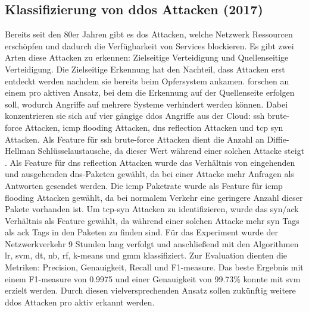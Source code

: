 \documentclass[
    12pt, %
    DIV10,
    ngerman, %
    a4paper, %
    oneside, %
    titlepage, %
    parskip=half, %
    headings=normal, %
    listof=totoc, %
    bibliography=totoc, %
    index=totoc, %
    captions=tableheading, %
    final %
]{scrreprt}
\begin{document}
\subsection{Klassifizierung von \acs{ddos} Attacken (2017)}
Bereits seit den 80er Jahren gibt es \ac{dos} Attacken, welche Netzwerk Ressourcen erschöpfen und dadurch die Verfügbarkeit von Services blockieren. Es gibt zwei Arten diese Attacken zu erkennen: Zielseitige Verteidigung und Quellenseitige Verteidigung\parencite{He2017}. Die Zielseitige Erkennung hat den Nachteil, dass Attacken erst entdeckt werden nachdem sie bereits beim Opfersystem ankamen. \textcite{He2017} forschen an einem pro aktiven Ansatz, bei dem die Erkennung auf der Quellenseite erfolgen soll, wodurch Angriffe auf mehrere Systeme verhindert werden können. Dabei konzentrieren sie sich auf vier gängige \ac{ddos} Angriffe aus der Cloud: \ac{ssh} brute-force Attacken, \ac{icmp} flooding Attacken, \ac{dns} reflection Attacken und \ac{tcp} \ac{syn} Attacken. Als Feature für \ac{ssh} brute-force Attacken dient die Anzahl an Diffie-Hellman Schlüsselaustausche, da dieser Wert während einer solchen Attacke steigt \parencite{He2017}. Als Feature für \ac{dns} reflection Attacken wurde das Verhältnis von eingehenden und ausgehenden \ac{dns}-Paketen gewählt, da bei einer Attacke mehr Anfragen als Antworten gesendet werden. Die \ac{icmp} Paketrate wurde als Feature für \ac{icmp} flooding Attacken gewählt, da bei normalem Verkehr eine geringere Anzahl dieser Pakete vorhanden ist. Um \ac{tcp}-\ac{syn} Attacken zu identifizieren, wurde das \ac{syn}/\ac{ack} Verhältnis als Feature gewählt, da während einer solchen Attacke mehr \ac{syn} Tags als \ac{ack} Tags in den Paketen zu finden sind. Für das Experiment wurde der Netzwerkverkehr 9 Stunden lang verfolgt und anschließend mit den Algorithmen \ac{lr}, \ac{svm}, \ac{dt}, \ac{nb}, \ac{rf}, k-means und \ac{gmm} klassifiziert. Zur Evaluation dienten die Metriken: Precision, Genauigkeit, Recall und F1-measure. Das beste Ergebnis mit einem F1-measure von 0.9975 und einer Genauigkeit von 99.73\% konnte mit \ac{svm} erzielt werden.
Durch diesen vielversprechenden Ansatz sollen zukünftig weitere \ac{ddos} Attacken pro aktiv erkannt werden.
%
\end{document}
